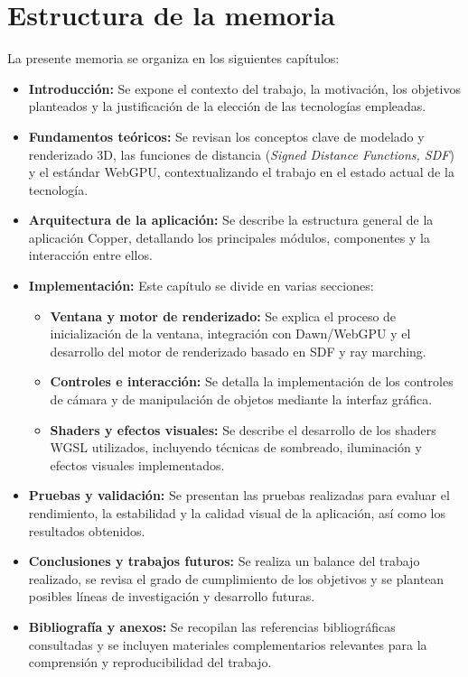 \section{Estructura de la memoria}

La presente memoria se organiza en los siguientes capítulos:

\begin{itemize}
    \item \textbf{Introducción:} Se expone el contexto del trabajo, la motivación, los objetivos planteados y la justificación de la elección de las tecnologías empleadas.
    \item \textbf{Fundamentos teóricos:} Se revisan los conceptos clave de modelado y renderizado 3D, las funciones de distancia (\textit{Signed Distance Functions, SDF}) y el estándar WebGPU, contextualizando el trabajo en el estado actual de la tecnología.
    \item \textbf{Arquitectura de la aplicación:} Se describe la estructura general de la aplicación Copper, detallando los principales módulos, componentes y la interacción entre ellos.
    \item \textbf{Implementación:} Este capítulo se divide en varias secciones:
    \begin{itemize}
        \item \textbf{Ventana y motor de renderizado:} Se explica el proceso de inicialización de la ventana, integración con Dawn/WebGPU y el desarrollo del motor de renderizado basado en SDF y ray marching.
        \item \textbf{Controles e interacción:} Se detalla la implementación de los controles de cámara y de manipulación de objetos mediante la interfaz gráfica.
        \item \textbf{Shaders y efectos visuales:} Se describe el desarrollo de los shaders WGSL utilizados, incluyendo técnicas de sombreado, iluminación y efectos visuales implementados.
    \end{itemize}
    \item \textbf{Pruebas y validación:} Se presentan las pruebas realizadas para evaluar el rendimiento, la estabilidad y la calidad visual de la aplicación, así como los resultados obtenidos.
    \item \textbf{Conclusiones y trabajos futuros:} Se realiza un balance del trabajo realizado, se revisa el grado de cumplimiento de los objetivos y se plantean posibles líneas de investigación y desarrollo futuras.
    \item \textbf{Bibliografía y anexos:} Se recopilan las referencias bibliográficas consultadas y se incluyen materiales complementarios relevantes para la comprensión y reproducibilidad del trabajo.
\end{itemize}